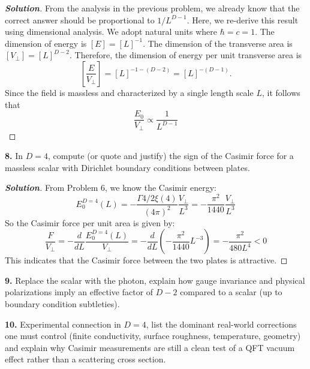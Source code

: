 \documentclass[11pt]{article}
\newenvironment{solution}[1][]{\begin{proof}[\textbf{Solution}]}{\end{proof}}
\begin{document}
\begin{solution}[17.7]
From the analysis in the previous problem, we already know that the correct answer should be proportional to $1/L^{D-1}$. Here, we re-derive this result using dimensional analysis. We adopt natural units where $\hbar=c=1$. The dimension of energy is $[E]=[L]^{-1}$. The dimension of the transverse area is $[V_\perp]=[L]^{D-2}$. Therefore, the dimension of energy per unit transverse area is
\begin{equation}
	\left[\frac{E}{V_\perp}\right] = [L]^{-1-(D-2)} = [L]^{-(D-1)}.
\end{equation}
Since the field is massless and characterized by a single length scale $L$, it follows that
\begin{equation}
	\boxed{\frac{E_{0}}{V_{\perp}} \propto \frac{1}{L^{D-1}}}
\end{equation}
\end{solution}

\begin{tcolorbox}[problem]
\textbf{8.} In $D=4$, compute (or quote and justify) the sign of the Casimir force for a massless scalar with Dirichlet boundary conditions between plates.
\end{tcolorbox}
\begin{solution}[17.8]
	From Problem 6, we know the Casimir energy:
	\[
	E_0^{D=4}(L)=-\frac{\Gamma{4/2}\xi(4)}{(4\pi)^2}\frac{V_\perp}{L^3}=-\frac{\pi^2}{1440}\frac{V_\perp}{L^3}
	\]
	So the Casimir force per unit area is given by:
	\[
	\frac{F}{V_\perp}=-\frac{d}{dL}\frac{E_0^{D=4}(L)}{V_\perp}=-\frac{d}{dL}\left(-\frac{\pi^{2}}{1440}L^{-3}\right)=-\frac{\pi^{2}}{480L^{4}}<0
	\]
	This indicates that the Casimir force between the two plates is attractive.
\end{solution}
\begin{tcolorbox}[problem]
\textbf{9.} Replace the scalar with the photon, explain how gauge invariance and physical polarizations imply an effective factor of $D-2$ compared to a scalar (up to boundary condition subtleties).
\end{tcolorbox}

\begin{tcolorbox}[problem]
\textbf{10.} Experimental connection in $D=4$, list the dominant real-world corrections one must control (finite conductivity, surface roughness, temperature, geometry) and explain why Casimir measurements are still a clean test of a QFT vacuum effect rather than a scattering cross section.
\end{tcolorbox}
\end{document}
